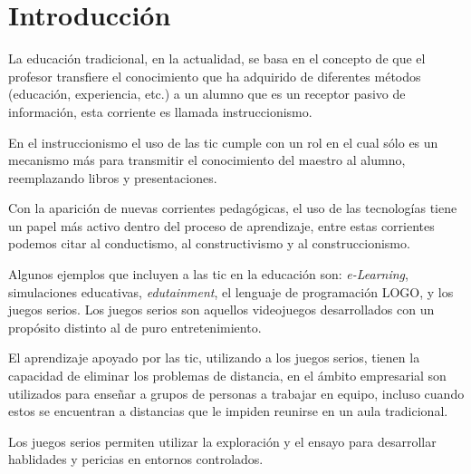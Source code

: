 \chapter{Introducción}
\label{chap:introduccion}




La educación tradicional, en la actualidad, se basa en el concepto de que el
profesor transfiere el conocimiento que ha adquirido de diferentes métodos
(educación, experiencia, etc.) a un alumno que es un receptor pasivo de
información, esta corriente es llamada
instruccionismo\cite{laptop:instructionism}. 

En el instruccionismo el uso de las \Gls{tic} cumple con un rol en el cual
sólo es un mecanismo más para transmitir el conocimiento del maestro al alumno,
reemplazando libros y presentaciones. 

Con la aparición de nuevas corrientes pedagógicas, el uso de las tecnologías
tiene un papel más activo dentro del proceso de aprendizaje, entre estas
corrientes podemos citar al conductismo, al constructivismo y al
construccionismo. 


Algunos ejemplos que incluyen a las \gls{tic} en la educación son:
\emph{e-Learning}, simulaciones educativas, \emph{edutainment}, el lenguaje de
programación LOGO, y los juegos serios. Los juegos serios son aquellos
videojuegos desarrollados con un propósito distinto al de puro entretenimiento.

El aprendizaje apoyado por las \Gls{tic}, utilizando a los juegos serios, tienen
la capacidad de eliminar los problemas de distancia, en el ámbito empresarial
son utilizados para enseñar a grupos de personas a trabajar en equipo, incluso
cuando estos se encuentran a distancias que le impiden reunirse en un aula
tradicional\cite{mariluz:seiousgames}. 

Los juegos serios permiten utilizar la exploración y el ensayo para desarrollar
hablidades y pericias en entornos
controlados\cite{humphreys2013developing,sg:aoverview}.
   


